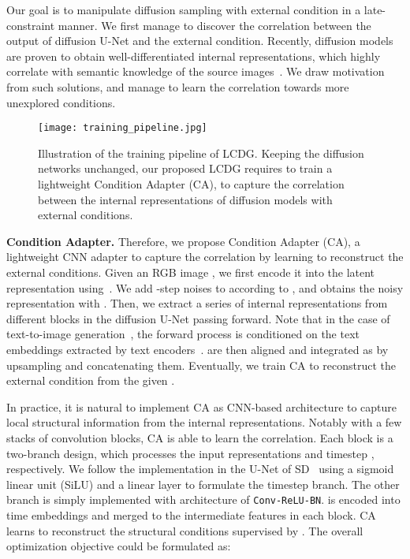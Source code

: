 \documentclass{article}
\begin{document}
Our goal is to manipulate diffusion sampling with external condition in a late-constraint manner. We first manage to discover the correlation between the output of diffusion U-Net and the external condition. Recently, diffusion models are proven to obtain well-differentiated internal representations, which highly correlate with semantic knowledge of the source images~\cite{baranchuk2021label, xu2023open}. We draw motivation from such solutions, and manage to learn the correlation towards more unexplored conditions.

\begin{figure*}[t!]
  \label{figure:training pipeline}
  \centering
  \texttt{[image: training\_pipeline.jpg]} \vspace{-1em}
  \caption{Illustration of the training pipeline of LCDG. Keeping the diffusion networks unchanged, our proposed LCDG requires to train a lightweight Condition Adapter (CA), to capture the correlation between the internal representations of diffusion models with external conditions.}
  \vspace{-1em}
  \end{figure*}

\textbf{Condition Adapter.} Therefore, we propose Condition Adapter (CA), a lightweight CNN adapter to capture the correlation by learning to reconstruct the external conditions. Given an RGB image , we first encode it into the latent representation  using~\cite{esser2021taming}. We add -step noises to  according to , and obtains the noisy representation  with . Then, we extract a series of internal representations  from different blocks  in the diffusion U-Net passing  forward. Note that in the case of text-to-image generation~\cite{rombach2022high}, the forward process is conditioned on the text embeddings  extracted by text encoders~\cite{radford2021learning, cherti2022reproducible}.  are then aligned and integrated as  by upsampling and concatenating them. Eventually, we train CA to reconstruct the external condition from the given .

In practice, it is natural to implement CA as CNN-based architecture to capture local structural information from the internal representations. Notably with a few stacks of convolution blocks, CA is able to learn the correlation. Each block is a two-branch design, which processes the input representations  and timestep , respectively. We follow the implementation in the U-Net of SD~\cite{nichol2021improved} using a sigmoid linear unit (SiLU) and a linear layer to formulate the timestep branch. The other branch is simply implemented with architecture of \texttt{Conv-ReLU-BN}.  is encoded into time embeddings and merged to the intermediate features in each block. CA learns to reconstruct the structural conditions supervised by . The overall optimization objective could be formulated as:
\end{document}
